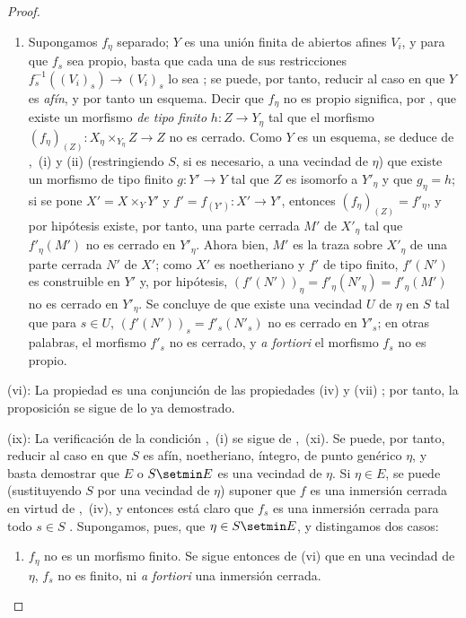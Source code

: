 \begin{proof}
\begin{enumerate}[label=\upshape{$\arabic{enumi}^\circ$}]
  \item Supongamos $f_\eta$ separado; $Y$ es una unión finita de abiertos afines $V_i$, y para que $f_s$ sea propio, basta que cada una de sus restricciones $f_s^{-1}((V_i)_s)\to(V_i)_s$ lo sea ; se puede, por tanto, reducir al caso en que $Y$ es \emph{afín}, y por tanto un esquema.
  Decir que $f_\eta$ no es propio significa, por , que existe un morfismo \emph{de tipo finito} $h:Z\to Y_\eta$ tal que el morfismo $(f_\eta)_{(Z)}:X_\eta\times_{Y_\eta}Z\to Z$ no es cerrado.
  Como $Y$ es un esquema, se deduce de ,~(i) y (ii) (restringiendo $S$, si es necesario, a una vecindad de $\eta$) que existe un morfismo de tipo finito $g:Y'\to Y$ tal que $Z$ es isomorfo a $Y'_\eta$ y que $g_\eta=h$;
  si se pone $X'=X\times_YY'$ y $f'=f_{(Y')}:X'\to Y'$, entonces $(f_\eta)_{(Z)}=f'_\eta$, y por hipótesis existe, por tanto, una parte cerrada $M'$ de $X'_\eta$ tal que $f'_\eta(M')$ no es cerrado en $Y'_\eta$.
  Ahora bien, $M'$ es la traza sobre $X'_\eta$ de una parte cerrada $N'$ de $X'$; como $X'$ es noetheriano y $f'$ de tipo finito, $f'(N')$ es construible en $Y'$  y, por hipótesis, $(f'(N'))_\eta=f'_\eta(N'_\eta)=f'_\eta(M')$ no es cerrado en $Y'_\eta$.
  Se concluye de  que existe una vecindad $U$ de $\eta$ en $S$ tal que para $s\in U$, $(f'(N'))_s=f'_s(N'_s)$ no es cerrado en $Y'_s$; en otras palabras, el morfismo $f'_s$ no es cerrado, y \emph{a fortiori} el morfismo $f_s$ no es propio.
\end{enumerate}

(vi): La propiedad es una conjunción de las propiedades (iv) y (vii) ; por tanto, la proposición se sigue de lo ya demostrado.

(ix): La verificación de la condición ,~(i) se sigue de ,~(xi).
Se puede, por tanto, reducir al caso en que $S$ es afín, noetheriano, íntegro, de punto genérico $\eta$, y basta demostrar que $E$ o $S\setmin E$ es una vecindad de $\eta$.
Si $\eta\in E$, se puede (sustituyendo $S$ por una vecindad de $\eta$) suponer que $f$ es una inmersión cerrada en virtud de ,~(iv), y entonces está claro que $f_s$ es una inmersión cerrada para todo $s\in S$ .
Supongamos, pues, que $\eta\in S\setmin E$, y distingamos dos casos:
\begin{enumerate}[label=\upshape{$\arabic{enumi}^\circ$}]
  \item $f_\eta$ no es un morfismo finito.
  Se sigue entonces de (vi) que en una vecindad de $\eta$, $f_s$ no es finito, ni \emph{a fortiori} una inmersión cerrada.


\end{enumerate}
\end{proof}
